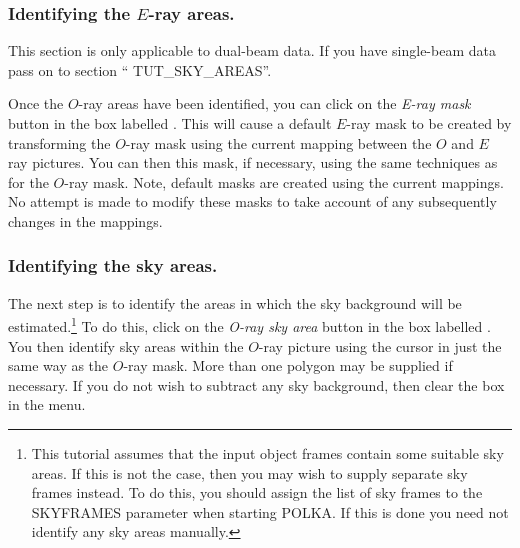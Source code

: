 \documentclass[11pt,nolof]{starlink}
\providecommand{\mylabel}[1] {\xlabel{#1}\label{#1}}
\begin{document}
\subsubsection {Identifying the $E$-ray areas.}
This section is only applicable to dual-beam data. If you have
single-beam data pass on to section ``
{TUT_SKY_AREAS}''.

Once the $O$-ray areas have been identified, you can click on the \emph{E-ray mask} button in the box labelled . This will cause a default $E$-ray mask to be
created by transforming the $O$-ray mask using the current mapping
between the $O$ and $E$ ray pictures. You can then
 this mask, if necessary, using the
same techniques as for the $O$-ray mask. Note, default masks are created
using the current mappings. No attempt is made to modify these masks to
take account of any subsequently changes in the mappings.

\subsubsection {\mylabel{TUT_SKY_AREAS}Identifying the sky areas.}
The next step is to identify the areas in which the sky background will
be estimated.\footnote{This tutorial assumes that the input object frames
contain some suitable sky areas. If this is not the case, then you may
wish to supply separate sky frames instead. To do this, you should assign
the list of sky frames to the SKYFRAMES parameter when starting POLKA. If
this is done you need not identify any sky areas manually.} To do this,
click on the \emph{O-ray sky area} button in the box labelled
. You then identify sky areas
within the $O$-ray picture using the cursor in just the same way as the
$O$-ray mask. More than one polygon may be supplied if necessary. If you
do not wish to subtract any sky background, then clear the
 box in the
 menu.
\end{document}
